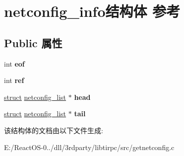 \hypertarget{structnetconfig__info}{}\section{netconfig\+\_\+info结构体 参考}
\label{structnetconfig__info}
\subsection*{Public 属性}
\begin{DoxyCompactItemize}
\item 
\mbox{\label{structnetconfig__info_a07fffc92302c453e8dfe89e008e638dc}} 
int {\bfseries eof}
\item 
\mbox{\label{structnetconfig__info_a98b1486efc7e91fab9a99aa29f3ce898}} 
int {\bfseries ref}
\item 
\mbox{\label{structnetconfig__info_acf4d2009bc256447b259412bde3eacef}} 
\hyperlink{interfacestruct}{struct} \hyperlink{structnetconfig__list}{netconfig\+\_\+list} $\ast$ {\bfseries head}
\item 
\mbox{\label{structnetconfig__info_a5433d707e49277f97a2df53919c81461}} 
\hyperlink{interfacestruct}{struct} \hyperlink{structnetconfig__list}{netconfig\+\_\+list} $\ast$ {\bfseries tail}
\end{DoxyCompactItemize}


该结构体的文档由以下文件生成\+:\begin{DoxyCompactItemize}
\item 
E\+:/\+React\+O\+S-\/0../dll/3rdparty/libtirpc/src/getnetconfig.\+c\end{DoxyCompactItemize}
